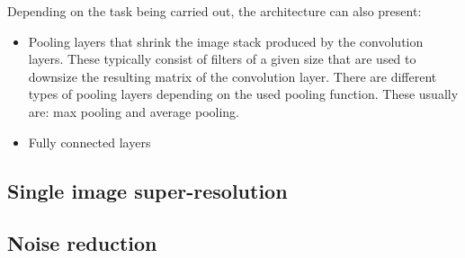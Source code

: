 Depending on the task being carried out, the architecture can also present:
\begin{itemize}
	\item Pooling layers that shrink the image stack produced by the convolution layers. These typically consist of filters of a given size that are used to downsize the resulting matrix of the convolution layer. There are different types of pooling layers depending on the used pooling function. These usually are: max pooling and average pooling.
	\item Fully connected layers 
\end{itemize}


\subsection{Single image super-resolution}

\subsection{Noise reduction}